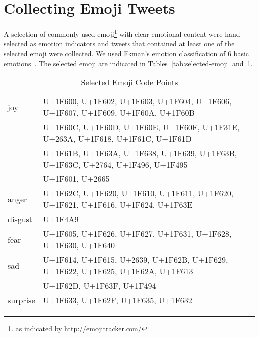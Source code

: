 \documentclass[10pt, a4paper]{article}
\begin{document}
\section{Collecting Emoji Tweets}
A selection of commonly used emoji\footnote{as indicated by http://emojitracker.com/} with clear emotional content were hand selected as emotion indicators and tweets that contained at least one of the selected emoji were collected. We used Ekman's emotion classification of 6 basic emotions~\cite{Ekman1992Argument}. The selected emoji are indicated in Tables~\ref{tab:selected-emoji} and~\ref{tab:selected-emoji-codpoints}.


\begin{table}
	\begin{tabular}{ll}
joy      & {\tiny U+1F600, U+1F602, U+1F603, U+1F604, U+1F606, U+1F607, U+1F609, U+1F60A, U+1F60B} \\
         & {\tiny U+1F60C, U+1F60D, U+1F60E, U+1F60F, U+1F31E, U+263A, U+1F618, U+1F61C, U+1F61D} \\
         & {\tiny U+1F61B, U+1F63A, U+1F638, U+1F639, U+1F63B, U+1F63C, U+2764, U+1F496, U+1F495} \\
         & {\tiny U+1F601, U+2665} \\
anger    & {\tiny U+1F62C, U+1F620, U+1F610, U+1F611, U+1F620, U+1F621, U+1F616, U+1F624, U+1F63E} \\
disgust  & {\tiny U+1F4A9} \\
fear     & {\tiny U+1F605, U+1F626, U+1F627, U+1F631, U+1F628, U+1F630, U+1F640} \\
sad      & {\tiny U+1F614, U+1F615, U+2639, U+1F62B, U+1F629, U+1F622, U+1F625, U+1F62A, U+1F613} \\
         & {\tiny U+1F62D, U+1F63F, U+1F494} \\
surprise & {\tiny U+1F633, U+1F62F, U+1F635, U+1F632} \\
	\end{tabular}
	\caption{Selected Emoji Code Points}
	\label{tab:selected-emoji-codpoints}
\end{table}
\end{document}
